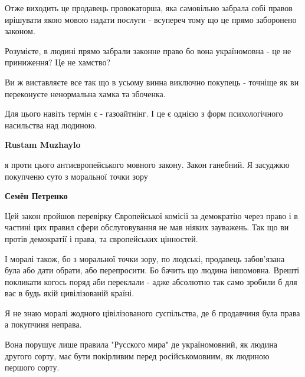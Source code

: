 \begin{itemize}
\begin{itemize}
Отже виходить це продавець провокаторша, яка самовільно забрала собі правов
ирішувати якою мовою надати послуги - всупереч тому що це прямо заборонено
законом.

Розумієте, в людині прямо забрали законне право бо вона україномовна - це не
приниження? Це не хамство?

Ви ж виставляєте все так що в усьому винна виключно покупець - точніще як ви
переконуєте ненормальна хамка та збоченка.

Для цього навіть термін є - газоайтнінг. І це є однією з форм психологічного
насильства над людиною.

 
\textbf{Rustam Muzhaylo} 

я проти цього антиєвропейського мовного закону. Закон ганебний. Я засуджкю
покупченю суто з моральної точки зору


 
\textbf{Семён Петренко}

Цей закон пройшов перевірку Європейської комісії за демократію через право і в
частині цих правил сфери обслуговування не мав ніяких зауважень. Так що ви
протів демократії і права, та європейських цінностей.

І моралі також, бо з моральної точки зору, по людські, продавець забов'язана
була або дати обрати, або перепросити. Бо бачить що людина іншомовна. Врешті
покликати когось поряд аби переклали - адже абсолютно так само зробили б для
вас в будь якій цивілізованій країні.

Я не знаю моралі жодного цівілізованого суспільства, де б продавчиня була права
а покупчиня неправа.

Вона порушує лише правила "Русского мира" де україномовний, як людина другого
сорту, має бути покірливим перед російськомовним, як людиною першого сорту.

 

\end{itemize}
\end{itemize}
